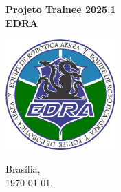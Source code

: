 

\usepackage{blindtext}


\begin{titlepage}
\begin{center}
\textbf{\Huge Projeto Trainee 2025.1}\\[0.5cm]  %
\textbf{\Large EDRA}\\[0.2cm]  %
\end{center}



\vspace{200pt}
\includegraphics[width=120pt,right]{Fixos/imagens/Logo_EDRA - Atual.png}

\par
\vfill
\begin{center}
{{\normalsize Brasília,}\\
{\normalsize \today.}}
\end{center}
\end{titlepage}

\newpage
\renewcommand{\contentsname}{\centering Sumário}
\tableofcontents

\newpage

\newpage

\newpage

\newpage

\newpage

\newpage
%



